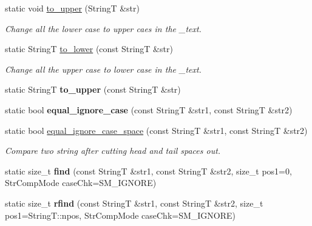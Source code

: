\begin{CompactItemize}
\item 
static void \hyperlink{classAlgorithm_42e06428b21a425ac2da8d60313ab9a9}{to\_\-upper} (StringT \&str)
\begin{CompactList}\small\item\em Change all the lower case to upper caes in the \_\-text. \item\end{CompactList}\item 
static StringT \hyperlink{classAlgorithm_617415dba55cc4533e4776760178032b}{to\_\-lower} (const StringT \&str)
\begin{CompactList}\small\item\em Change all the upper case to lower case in the \_\-text. \item\end{CompactList}\item 
\hypertarget{classAlgorithm_98f7e6214b85d3d3ee160561e09cd5e5}{
static StringT \textbf{to\_\-upper} (const StringT \&str)}
\label{classAlgorithm_98f7e6214b85d3d3ee160561e09cd5e5}

\item 
\hypertarget{classAlgorithm_444f53fac69e2f1e91b9b300177d2b4f}{
static bool \textbf{equal\_\-ignore\_\-case} (const StringT \&str1, const StringT \&str2)}
\label{classAlgorithm_444f53fac69e2f1e91b9b300177d2b4f}

\item 
\hypertarget{classAlgorithm_21544fc764f56bf9af2e131b115fbd47}{
static bool \hyperlink{classAlgorithm_21544fc764f56bf9af2e131b115fbd47}{equal\_\-ignore\_\-case\_\-space} (const StringT \&str1, const StringT \&str2)}
\label{classAlgorithm_21544fc764f56bf9af2e131b115fbd47}

\begin{CompactList}\small\item\em Compare two string after cutting head and tail spaces out. \item\end{CompactList}\item 
\hypertarget{classAlgorithm_34bcaa8f2331a16cf2abc6f37a277215}{
static size\_\-t \textbf{find} (const StringT \&str1, const StringT \&str2, size\_\-t pos1=0, StrCompMode caseChk=SM\_\-IGNORE)}
\label{classAlgorithm_34bcaa8f2331a16cf2abc6f37a277215}

\item 
\hypertarget{classAlgorithm_00d3a1589a173329d9a39b407e237e1f}{
static size\_\-t \textbf{rfind} (const StringT \&str1, const StringT \&str2, size\_\-t pos1=StringT::npos, StrCompMode caseChk=SM\_\-IGNORE)}
\label{classAlgorithm_00d3a1589a173329d9a39b407e237e1f}


\end{CompactItemize}

